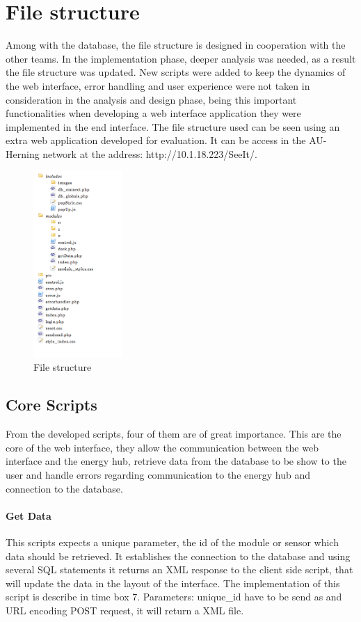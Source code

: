 \section{File structure}
Among with the database, the file structure is designed in cooperation with the other teams. In the implementation phase, deeper analysis was needed, as a result the file structure was updated. New scripts were added to keep the dynamics of the web interface, error handling and user experience were not taken in consideration in the analysis and design phase, being this important functionalities when developing a web interface application they were implemented in the end interface.
\p
The file structure used can be seen using an extra web application developed for evaluation. It can be access in the AU-Herning network at the address: http://10.1.18.223/SeeIt/.
\begin{figure}[H]
	\begin{centering}
		\includegraphics[width=0.3\textwidth]{images/file_structure.png}
		\caption{File structure}
	\end{centering}
\end{figure}
%
\subsection{Core Scripts}
From the developed scripts, four of them are of great importance. This are the core of the web interface, they allow the communication between the web interface and the energy hub, retrieve data from the database to be show to the user and handle errors regarding communication to the energy hub and connection to the database.

\paragraph{Get Data}
This scripts expects a unique parameter, the id of the module or sensor which data should be retrieved. It establishes the connection to the database and using several SQL statements it returns an XML response to the client side script, that will update the data in the layout of the interface. The implementation of this script is describe in time box 7.
\p
Parameters: unique\_id have to be send as and URL encoding POST request, it will return a XML file.
